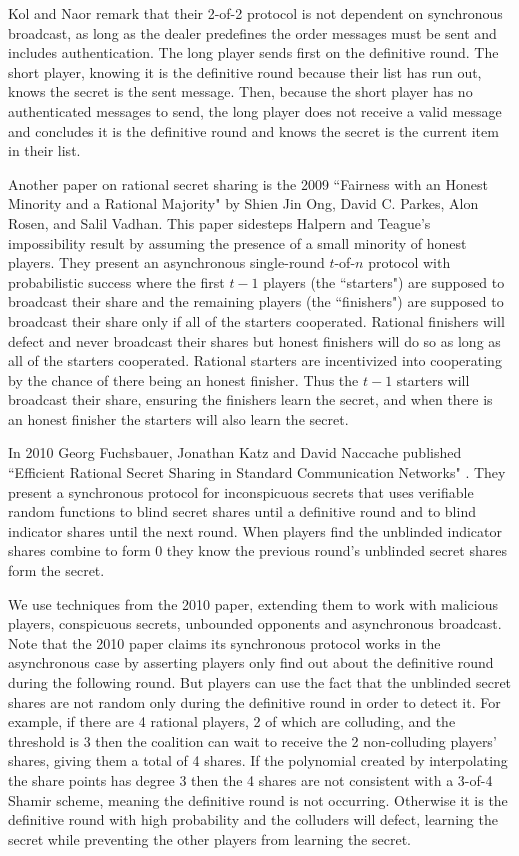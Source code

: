 \documentclass{dalcsthesis}
\begin{document}
Kol and Naor remark that their 2-of-2 protocol is not dependent on synchronous broadcast, as long as the dealer predefines the order messages must be sent and includes authentication. The long player sends first on the definitive round. The short player, knowing it is the definitive round because their list has run out, knows the secret is the sent message. Then, because the short player has no authenticated messages to send, the long player does not receive a valid message and concludes it is the definitive round and knows the secret is the current item in their list.

Another paper on rational secret sharing is the 2009 ``Fairness with an Honest Minority and a Rational Majority" \cite{ong09} by Shien Jin Ong, David C. Parkes, Alon Rosen, and Salil Vadhan. This paper sidesteps Halpern and Teague's impossibility result by assuming the presence of a small minority of honest players. They present an asynchronous single-round $t$-of-$n$ protocol with probabilistic success where the first $t-1$ players (the ``starters") are supposed to broadcast their share and the remaining players (the ``finishers") are supposed to broadcast their share only if all of the starters cooperated. Rational finishers will defect and never broadcast their shares but honest finishers will do so as long as all of the starters cooperated. Rational starters are incentivized into cooperating by the chance of there being an honest finisher. Thus the $t-1$ starters will broadcast their share, ensuring the finishers learn the secret, and when there is an honest finisher the starters will also learn the secret.

In 2010 Georg Fuchsbauer, Jonathan Katz and David Naccache published ``Efficient Rational Secret Sharing in Standard Communication Networks" \cite{fuch10}. They present a synchronous protocol for inconspicuous secrets that uses verifiable random functions to blind secret shares until a definitive round and to blind indicator shares until the next round. When players find the unblinded indicator shares combine to form 0 they know the previous round's unblinded secret shares form the secret.

We use techniques from the 2010 paper, extending them to work with malicious players, conspicuous secrets, unbounded opponents and asynchronous broadcast. Note that the 2010 paper claims its synchronous protocol works in the asynchronous case by asserting players only find out about the definitive round during the following round. But players can use the fact that the unblinded secret shares are not random only during the definitive round in order to detect it. For example, if there are 4 rational players, 2 of which are colluding, and the threshold is 3 then the coalition can wait to receive the 2 non-colluding players' shares, giving them a total of 4 shares. If the polynomial created by interpolating the share points has degree 3 then the 4 shares are not consistent with a 3-of-4 Shamir scheme, meaning the definitive round is not occurring. Otherwise it is the definitive round with high probability and the colluders will defect, learning the secret while preventing the other players from learning the secret.
\end{document}
